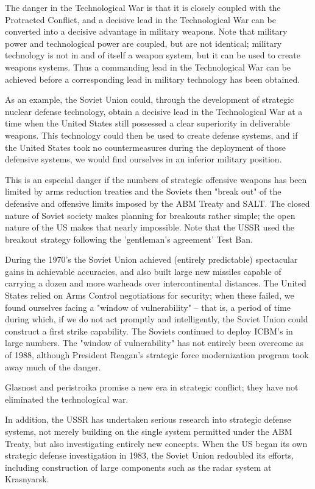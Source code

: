 \documentclass[a4paper,12pt]{book}
\begin{document}
The danger in the Technological War is that it is closely coupled with the Protracted Conflict, and a decisive lead in the Technological War can be converted into a decisive advantage in military weapons. Note that military power and technological power are coupled, but are not identical; military technology is not in and of itself a weapon system, but it can be used to create weapons systems. Thus a commanding lead in the Technological War can be achieved before a corresponding lead in military technology has been obtained.

As an example, the Soviet Union could, through the development of strategic nuclear defense technology, obtain a decisive lead in the Technological War at a time when the United States still possessed a clear superiority in deliverable weapons. This technology could then be used to create defense systems, and if the United States took no countermeasures during the deployment of those defensive systems, we would find ourselves in an inferior military position.

This is an especial danger if the numbers of strategic offensive weapons has been limited by arms reduction treaties and the Soviets then "break out" of the defensive and offensive limits imposed by the ABM Treaty and SALT. The closed nature of Soviet society makes planning for breakouts rather simple; the open nature of the US makes that nearly impossible. Note that the USSR used the breakout strategy following the 'gentleman's agreement' Test Ban.

During the 1970's the Soviet Union achieved (entirely predictable) spectacular gains in achievable accuracies, and also built large new missiles capable of carrying a dozen and more warheads over intercontinental distances. The United States relied on Arms Control negotiations for security; when these failed, we found ourselves facing a "window of vulnerability" -- that is, a period of time during which, if we do not act promptly and intelligently, the Soviet Union could construct a first strike capability. The Soviets continued to deploy ICBM's in large numbers. The "window of vulnerability" has not entirely been overcome as of 1988, although President Reagan's strategic force modernization program took away much of the danger.

Glasnost and peristroika promise a new era in strategic conflict; they have not eliminated the technological war.

In addition, the USSR has undertaken serious research into strategic defense systems, not merely building on the single system permitted under the ABM Treaty, but also investigating entirely new concepts. When the US began its own strategic defense investigation in 1983, the Soviet Union redoubled its efforts, including construction of large components such as the radar system at Krasnyarsk.
\end{document}
